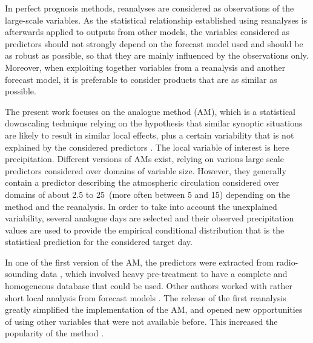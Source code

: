 \documentclass{ametsoc}
\begin{document}
In perfect prognosis methods, reanalyses are considered as observations of the large-scale variables. As the statistical relationship established using reanalyses is afterwards applied to outputs from other models, the variables considered as predictors should not strongly depend on the forecast model used and should be as robust as possible, so that they are mainly influenced by the observations only. Moreover, when exploiting together variables from a reanalysis and another forecast model, it is preferable to consider products that are as similar as possible.

The present work focuses on the analogue method (AM), which is a statistical downscaling technique relying on the hypothesis that similar synoptic situations are likely to result in similar local effects, plus a certain variability that is not explained by the considered predictors \citep{Lorenz1969}. The local variable of interest is here precipitation. Different versions of AMs exist, relying on various large scale predictors considered over domains of variable size. However, they generally contain a predictor describing the atmospheric circulation considered over domains of about 2.5 to 25\degree\ (more often between 5 and 15\degree) depending on the method and the reanalysis. In order to take into account the unexplained variability, several analogue days are selected and their observed precipitation values are used to provide the empirical conditional distribution that is the statistical prediction for the considered target day.

In one of the first version of the AM, the predictors were extracted from radio-sounding data \citep{Duband1981}, which involved heavy pre-treatment to have a complete and homogeneous database that could be used. Other authors worked with rather short local analysis from forecast models \cite[for example][]{Kruizinga1983, VandenDool1989}. The release of the first reanalysis \citep[NCEP/NCAR Reanalysis I, NR-1,][]{Kalnay1996, Kistler2001} greatly simplified the implementation of the AM, and opened new opportunities of using other variables that were not available before. This increased the popularity of the method \citep{Timbal2008a}.
\end{document}
